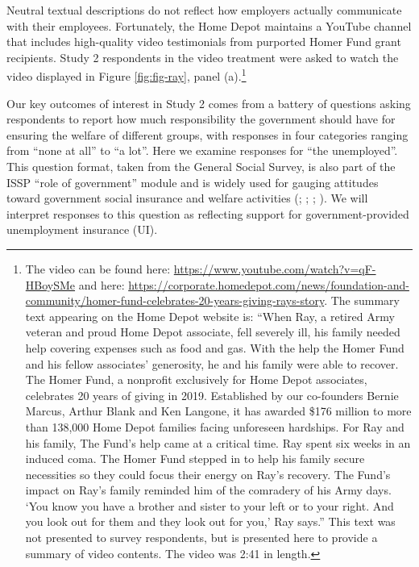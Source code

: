 \documentclass[
  11pt,
  oneside]{article}
\begin{document}
Neutral textual descriptions do not reflect how employers actually communicate with their employees. Fortunately, the Home Depot maintains a YouTube channel that includes high-quality video testimonials from purported Homer Fund grant recipients. Study 2 respondents in the video treatment were asked to watch the video displayed in Figure \ref{fig:fig-ray}, panel (a).\footnote{The video can be found here: \url{https://www.youtube.com/watch?v=qF-HBoySMe} and here: \url{https://corporate.homedepot.com/news/foundation-and-community/homer-fund-celebrates-20-years-giving-rays-story}. The summary text appearing on the Home Depot website is: ``When Ray, a retired Army veteran and proud Home Depot associate, fell severely ill, his family needed help covering expenses such as food and gas. With the help the Homer Fund and his fellow associates' generosity, he and his family were able to recover. The Homer Fund, a nonprofit exclusively for Home Depot associates, celebrates 20 years of giving in 2019. Established by our co-founders Bernie Marcus, Arthur Blank and Ken Langone, it has awarded \$176 million to more than 138,000 Home Depot families facing unforeseen hardships. For Ray and his family, The Fund's help came at a critical time. Ray spent six weeks in an induced coma. The Homer Fund stepped in to help his family secure necessities so they could focus their energy on Ray's recovery. The Fund's impact on Ray's family reminded him of the comradery of his Army days. `You know you have a brother and sister to your left or to your right. And you look out for them and they look out for you,' Ray says.'' This text was not presented to survey respondents, but is presented here to provide a summary of video contents. The video was 2:41 in length.}

Our key outcomes of interest in Study 2 comes from a battery of questions asking respondents to report how much responsibility the government should have for ensuring the welfare of different groups, with responses in four categories ranging from ``none at all'' to ``a lot''. Here we examine responses for ``the unemployed''. This question format, taken from the General Social Survey, is also part of the ISSP ``role of government'' module and is widely used for gauging attitudes toward government social insurance and welfare activities (; ; ; ). We will interpret responses to this question as reflecting support for government-provided unemployment insurance (UI).
\end{document}
